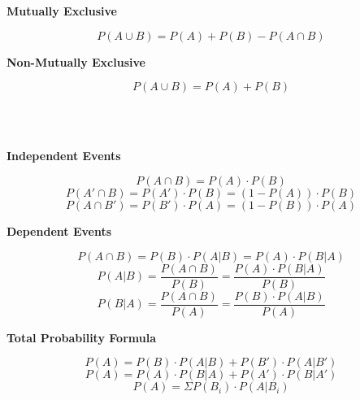 \documentclass{article}
\begin{document}
\noindent
\begin{minipage}[t]{0.5\textwidth}
\begin{center}
    \textbf{Mutually Exclusive}
\end{center}
\[P(A \cup B) = P(A) + P(B) - P(A \cap B)\]
\end{minipage}%
\begin{minipage}[t]{0.5\textwidth}
\begin{center}
    \textbf{Non-Mutually Exclusive}
\end{center}
\[P(A \cup B) = P(A) + P(B)\]
\end{minipage}
\\\\
\begin{minipage}[t]{0.5\textwidth}
\begin{center}
    \textbf{Independent Events}
\end{center}
\[P(A \cap B) = P(A) \cdot P(B)\]
\[P(A' \cap B) = P(A') \cdot P(B) = (1 - P(A)) \cdot P(B)\]
\[P(A \cap B') = P(B') \cdot P(A) = (1 - P(B)) \cdot P(A)\]
\end{minipage}%
\begin{minipage}[t]{0.5\textwidth}
\begin{center}
    \textbf{Dependent Events}
\end{center}
\[P(A \cap B) = P(B) \cdot P(A|B) = P(A) \cdot P(B|A)\]
\[P(A|B) = \frac{P(A \cap B)}{P(B)} = \frac{P(A) \cdot P(B|A)}{P(B)}\]
\[P(B|A) = \frac{P(A \cap B)}{P(A)} = \frac{P(B) \cdot P(A|B)}{P(A)}\]
\end{minipage}
\begin{center}
    \textbf{Total Probability Formula}
\end{center}
\[P(A) = P(B) \cdot P(A|B) + P(B') \cdot P(A|B')\]
\[P(A) = P(A) \cdot P(B|A) + P(A') \cdot P(B|A')\]
\[P(A) = \Sigma P(B_i) \cdot P(A | B_i)\]
\end{document}

